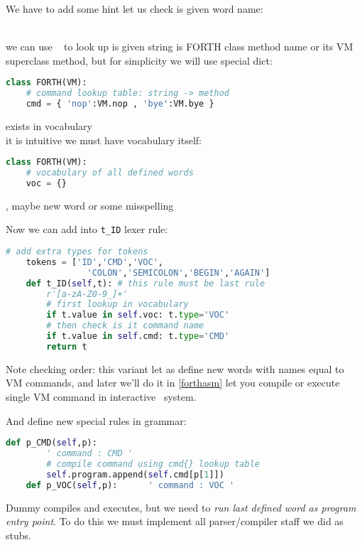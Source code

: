 We have to add some hint let us check is given word name:
\begin{description}[nosep]
\item[VM command]\ \\
we can use \py\  to look up is given string is FORTH
class method name or its VM superclass method, but for simplicity we will use
special dict:
\begin{lstlisting}[language=Python]
class FORTH(VM):
	# command lookup table: string -> method
	cmd = { 'nop':VM.nop , 'bye':VM.bye }
\end{lstlisting}
\item[already defined word] exists in vocabulary\\
it is intuitive we must have vocabulary itself:
\begin{lstlisting}[language=Python]
class FORTH(VM):
	# vocabulary of all defined words
	voc = {}
\end{lstlisting}
\item[undetected ID], maybe new word or some misspelling
\end{description}
Now we can add  into \verb|t_ID| lexer rule:
\begin{lstlisting}[language=Python]
	# add extra types for tokens
	tokens = ['ID','CMD','VOC',
				'COLON','SEMICOLON','BEGIN','AGAIN']
 	def t_ID(self,t): # this rule must be last rule
 		r'[a-zA-Z0-9_]+'
 		# first lookup in vocabulary
 		if t.value in self.voc: t.type='VOC'
 		# then check is it command name
 		if t.value in self.cmd: t.type='CMD'
 		return t 
\end{lstlisting}
Note checking order: this variant let as define new words with names equal to VM
commands, and later we'll do it in  \ref{forthasm} let you
compile or execute single VM command in interactive \F\ system.

\clearpage
And define new special rules in grammar:
\begin{lstlisting}[language=Python]
 	def p_CMD(self,p):
 		' command : CMD '
 		# compile command using cmd{} lookup table
 		self.program.append(self.cmd[p[1]])
 	def p_VOC(self,p):		' command : VOC '
\end{lstlisting}

Dummy compiles and executes, but
we need to \emph{run last defined word as program entry point}. To do this we
must implement all parser/compiler staff we did as stubs.

\clearpage
